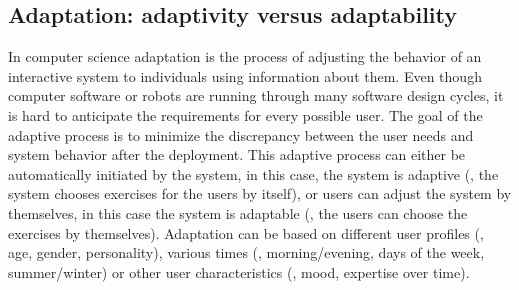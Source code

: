 
\subsection{Adaptation: adaptivity versus adaptability}
In computer science adaptation is the process of adjusting the behavior of an interactive system to individuals using information about them. 
Even though computer software or robots are running through many software design cycles, it is hard to anticipate the requirements for every possible user. 
The goal of the adaptive process is to minimize the discrepancy between the user needs and system behavior after the deployment.
This adaptive process can either be automatically initiated by the system, in this case, the system is adaptive (\eg{}, the system chooses exercises for the users by itself), or users can adjust the system by themselves, in this case the system is adaptable (\eg{}, the users can choose the exercises by themselves). 
Adaptation can be based on different user profiles (\eg{}, age, gender, personality), various times (\eg{}, morning/evening, days of the week, summer/winter) or other user characteristics (\eg{}, mood, expertise over time). 



